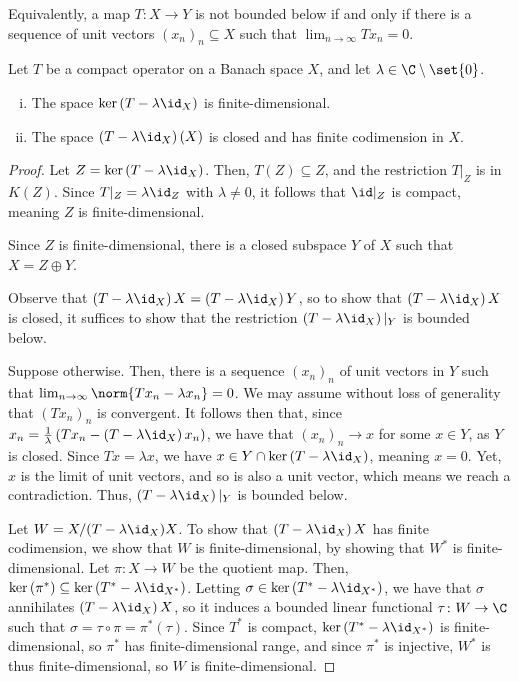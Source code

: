 \documentclass[10pt]{mypackage}
\begin{document}
Equivalently, a map $T\colon X\rightarrow Y$ is not bounded below if and only if there is a sequence of unit vectors $\left( x_n \right)_n\subseteq X$ such that $\lim_{n\rightarrow \infty}Tx_n = 0$.
\begin{theorem}
  Let $T$ be a compact operator on a Banach space $X$, and let $\lambda\in \C\setminus \set{0}$.
  \begin{enumerate}[(i)]
    \item The space $\ker\left( T-\lambda \id_X \right)$ is finite-dimensional.
    \item The space $\left( T-\lambda \id_X \right)(X)$ is closed and has finite codimension in $X$.
  \end{enumerate}
\end{theorem}
\begin{proof}
  Let $Z = \ker\left( T-\lambda \id_X \right)$. Then, $T(Z)\subseteq Z$, and the restriction $T|_{Z}$ is in $K(Z)$. Since $T|_{Z} = \lambda \id_Z$ with $\lambda\neq 0$, it follows that $\id|_{Z}$ is compact, meaning $Z$ is finite-dimensional.

  Since $Z$ is finite-dimensional, there is a closed subspace $Y$ of $X$ such that $X = Z\oplus Y$. 

  Observe that $\left( T - \lambda \id_X \right)X = \left( T - \lambda\id_X \right)Y$, so to show that $\left( T-\lambda\id_X \right)X$ is closed, it suffices to show that the restriction $\left( T - \lambda\id_X \right)|_{Y}$ is bounded below.

  Suppose otherwise. Then, there is a sequence $\left( x_n \right)_n$ of unit vectors in $Y$ such that $\lim_{n\rightarrow\infty}\norm{Tx_n - \lambda x_n} = 0$. We may assume without loss of generality that $\left( Tx_n \right)_n$ is convergent. It follows then that, since $x_n = \frac{1}{\lambda} \left( Tx_n - \left( T - \lambda\id_X \right)x_n \right)$, we have that $\left( x_n \right)_n\rightarrow x$ for some $x\in Y$, as $Y$ is closed. Since $Tx = \lambda x$, we have $x\in Y\cap \ker\left( T-\lambda\id_X \right)$, meaning $x = 0$. Yet, $x$ is the limit of unit vectors, and so is also a unit vector, which means we reach a contradiction. Thus, $\left( T - \lambda\id_X \right)|_{Y}$ is bounded below.

  Let $W = X/(T-\lambda\id_X)X$. To show that $\left( T-\lambda\id_X \right)X$ has finite codimension, we show that $W$ is finite-dimensional, by showing that $W^{\ast}$ is finite-dimensional. Let $\pi\colon X\rightarrow W$ be the quotient map. Then, $\ker\left( \pi^{\ast} \right)\subseteq \ker\left( T^{\ast}-\lambda\id_{X^{\ast}} \right)$. Letting $\sigma\in \ker\left( T^{\ast}-\lambda\id_{X^{\ast}} \right)$, we have that $\sigma$ annihilates $\left( T-\lambda\id_X \right)X$, so it induces a bounded linear functional $\tau\colon W\rightarrow \C$ such that $\sigma = \tau\circ\pi = \pi^{\ast}(\tau)$. Since $T^{\ast}$ is compact, $\ker\left( T^{\ast}-\lambda\id_{X^{\ast}} \right)$ is finite-dimensional, so $\pi^{\ast}$ has finite-dimensional range, and since $\pi^{\ast}$ is injective, $W^{\ast}$ is thus finite-dimensional, so $W$ is finite-dimensional. 
\end{proof}
\end{document}
